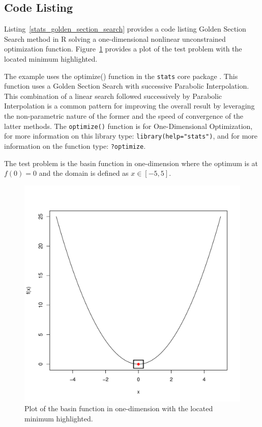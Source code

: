 \subsection{Code Listing}
Listing~\ref{stats_golden_section_search} provides a code listing Golden Section Search method in R solving a one-dimensional nonlinear unconstrained optimization function. Figure~\ref{plot:golden_section_search_result} provides a plot of the test problem with the located minimum highlighted.

The example uses the {optimize()} function in the \texttt{stats} core package \cite{RDevelopmentCoreTeam2011a}. This function uses a Golden Section Search with successive Parabolic Interpolation. This combination of a linear search followed successively by Parabolic Interpolation is a common pattern for improving the overall result by leveraging the non-parametric nature of the former and the speed of convergence of the latter methods. The \texttt{optimize()} function is for One-Dimensional Optimization, for more information on this library type: \texttt{library(help="stats")}, and for more information on the function type: \texttt{?optimize}.

The test problem is the basin function in one-dimension where the optimum is at $f(0)=0$ and the domain is defined as $x \in [-5,5]$. 



\begin{figure}[htp]
\centering
\includegraphics[scale=0.45]{a_optimization/golden_section_search_result.pdf}
\caption{Plot of the basin function in one-dimension with the located minimum highlighted.}
\label{plot:golden_section_search_result}
\end{figure}

